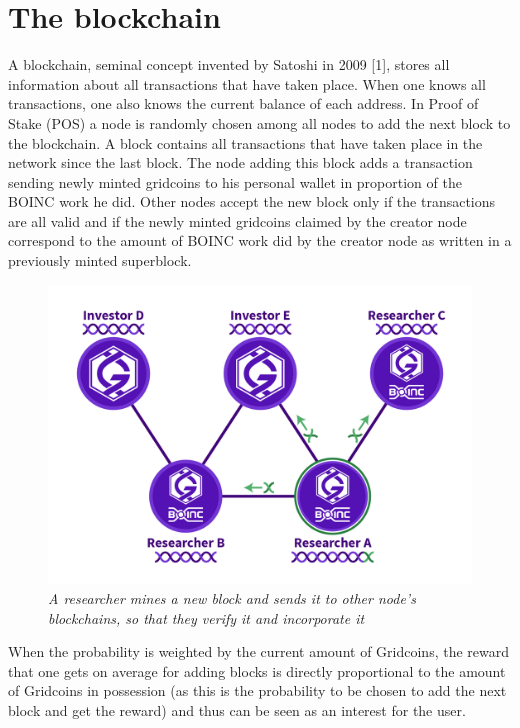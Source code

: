 \section{The blockchain}

A blockchain, seminal concept invented by Satoshi in 2009 [1], stores all information about all transactions that have taken place. When one knows all transactions, one also knows the current balance of each address. In Proof of Stake (POS) a node is randomly chosen among all nodes to add the next block to the blockchain. A block contains all transactions that have taken place in the network since the last block. The node adding this block adds a transaction sending newly minted gridcoins to his personal wallet in proportion of the BOINC work he did. Other nodes accept the new block only if the transactions are all valid and if the newly minted gridcoins claimed by the creator node correspond to the amount of BOINC work did by the creator node as written in a previously minted superblock. 

\begin{figure}
\centering
\includegraphics[scale=0.5]{figures/NetworkAndNodes_joshoeah}
\medskip
\caption{\textit{A researcher mines a new block and sends it to other node's blockchains, so that they verify it and incorporate it}}
\small
\end{figure}
 
When the probability is weighted by the current amount of Gridcoins, the reward that one gets on average for adding blocks is directly proportional to the amount of Gridcoins in possession (as this is the probability to be chosen to add the next block and get the reward) and thus can be seen as an interest for the user.
